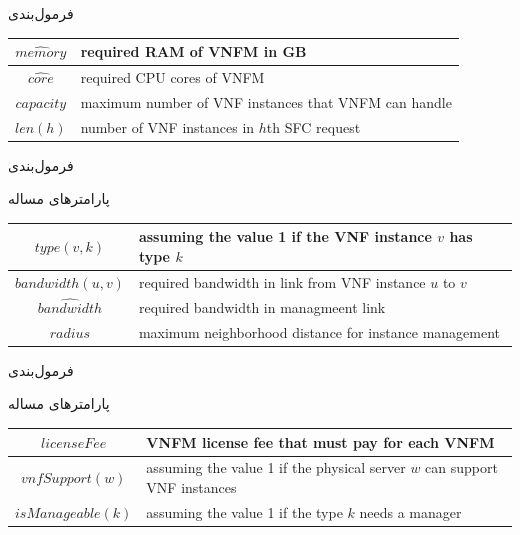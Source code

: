\documentclass{beamer}
\begin{document}
\begin{persian}
\begin{frame}{فرمول‌بندی}
\begin{center}
\begin{latin}
\begin{tabular}{|c|p{5cm}|}
        \hline
        \(\hat{memory}\) & required RAM of VNFM in GB \\
        \hline
        \(\hat{core}\) & required CPU cores of VNFM \\
        \hline
        \(capacity\) & maximum number of VNF instances that VNFM can handle \\
        \hline
        \(len(h)\) & number of VNF instances in \(h\)th SFC request \\
        \hline
    \end{tabular}\end{latin}\end{center}
\end{frame}
\begin{frame}{فرمول‌بندی}
    \par پارامترهای مساله
    \begin{center}\begin{latin}\begin{tabular}{|c|p{5cm}|}
        \hline
        \(type(v, k)\) & assuming the value 1 if the VNF instance \(v\) has type \(k\)  \\
        \hline
        \(bandwidth(u, v)\) & required bandwidth in link from VNF instance \(u\) to \(v\) \\
        \hline
        \(\hat{bandwidth}\) & required bandwidth in managmeent link \\
        \hline
        \(radius\) & maximum neighborhood distance for instance management \\
        \hline
    \end{tabular}\end{latin}\end{center}
\end{frame}
\begin{frame}{فرمول‌بندی}
    \par پارامترهای مساله
    \begin{center}\begin{latin}\begin{tabular}{|c|p{5cm}|}
        \hline
        \(licenseFee\) & VNFM license fee that must pay for each VNFM \\
        \hline
        \(vnfSupport(w)\) & assuming the value 1 if the physical server \(w\) can support VNF instances \\
        \hline
        \(isManageable(k)\) & assuming the value 1 if the type \(k\) needs a manager \\

\end{tabular}
\end{latin}
\end{center}
\end{frame}
\end{persian}
\end{document}
